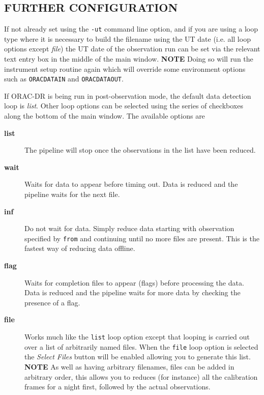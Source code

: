 \documentclass[twoside,11pt]{article}
\renewcommand{\_}{\texttt{\symbol{95}}}
\begin{document}
\subsection*{FURTHER CONFIGURATION\label{Xoracdr_FURTHER_CONFIGURATION}}


If not already set using the \texttt{-ut} command line option, and if you
are using a loop type where it is necessary to build the filename
using the UT date (i.e. all loop options except \textit{file}) the UT date
of the observation run can be set via the relevant text entry box in
the middle of the main window. \textbf{NOTE} Doing so will run the
instrument setup routine again which will override some environment
options such as \texttt{ORAC\_DATA\_IN} and \texttt{ORAC\_DATA\_OUT}.



If ORAC-DR is being run in post-observation mode, the default data
detection loop is \textit{list}. Other loop options can be selected using
the series of checkboxes along the bottom of the main window. The
available options are

\begin{description}

\item[{\textbf{list}}] \mbox{}

The pipeline will stop once the observations in the list have been
reduced.


\item[{\textbf{wait}}] \mbox{}

Waits for data to appear before timing out. Data is reduced and the
pipeline waits for the next file.


\item[{\textbf{inf}}] \mbox{}

Do not wait for data. Simply reduce data starting with observation
specified by \texttt{from} and continuing until no more files are present.
This is the fastest way of reducing data offline.


\item[{\textbf{flag}}] \mbox{}

Waits for completion files to appear (flags) before processing the
data.  Data is reduced and the pipeline waits for more data by
checking the presence of a flag.


\item[{\textbf{file}}] \mbox{}

Works much like the \texttt{list} loop option except that looping is carried
out over a list of arbitrarily named files. When the \texttt{file} loop option
is selected the \textit{Select Files} button will be enabled allowing you to
generate this list. \textbf{NOTE} As well as having arbitrary filenames,
files can be added in arbitrary order, this allows you to reduces (for
instance) all the calibration frames for a night first, followed by
the actual observations.

\end{description}
\end{document}
